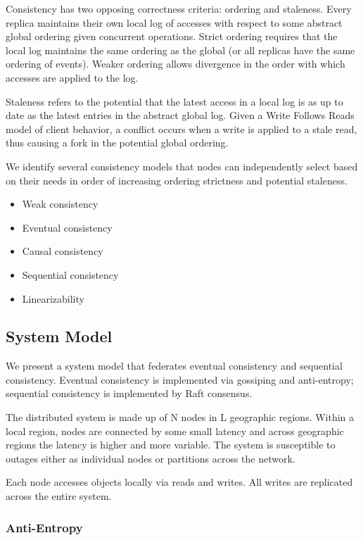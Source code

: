\documentclass[letterpaper,twocolumn,10pt]{article}
\begin{document}
Consistency has two opposing correctness criteria: ordering and staleness. Every replica maintains their own local log of accesses with respect to some abstract global ordering given concurrent operations. Strict ordering requires that the local log maintains the same ordering as the global (or all replicas have the same ordering of events). Weaker ordering allows divergence in the order with which accesses are applied to the log.

Staleness refers to the potential that the latest access in a local log is as up to date as the latest entries in the abstract global log. Given a Write Follows Reads model of client behavior, a conflict occurs when a write is applied to a stale read, thus causing a fork in the potential global ordering.


We identify several consistency models that nodes can independently select based on their needs in order of increasing ordering strictness and potential staleness.

\begin{itemize}
    \item Weak consistency
    \item Eventual consistency
    \item Causal consistency
    \item Sequential consistency
    \item Linearizability
\end{itemize}

\subsection{System Model}

We present a system model that federates eventual consistency and sequential consistency. Eventual consistency is implemented via gossiping and anti-entropy; sequential consistency is implemented by Raft consensus.

The distributed system is made up of N nodes in L geographic regions. Within a local region, nodes are connected by some small latency and across geographic regions the latency is higher and more variable. The system is susceptible to outages either as individual nodes or partitions across the network.

Each node accesses objects locally via reads and writes. All writes are replicated across the entire system.

\subsubsection{Anti-Entropy}
\end{document}
